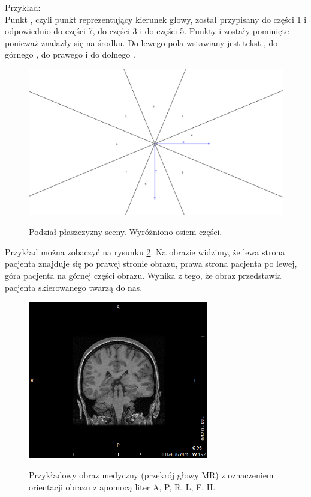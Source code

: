 \begin{itemize}
          Przykład:\\
          Punkt , czyli punkt reprezentujący kierunek głowy, został przypisany do części 1 i odpowiednio  do części 7,  do części 3 i  do części 5.
          Punkty  i  zostały pominięte ponieważ znalazły się na środku.
          Do lewego pola wstawiany jest tekst , do górnego , do prawego  i do dolnego .

          \begin{figure}[!htbp]
              \caption{Podział płaszczyzny sceny. Wyróżniono osiem części.}
              \includegraphics[width=\textwidth]{img/imageorientationindicator-004.png}
              \centering
              \label{fig:imageorientationindicator4}
          \end{figure}

          Przykład można zobaczyć na rysunku \ref{fig:imageorientationindicator1}.
          Na obrazie widzimy, że lewa strona pacjenta znajduje się po prawej stronie obrazu, prawa strona pacjenta po lewej, góra pacjenta na górnej części obrazu.
          Wynika z tego, że obraz przedstawia pacjenta skierowanego twarzą do nas.

          \begin{figure}[!htbp]
              \caption{Przykładowy obraz medyczny (przekrój głowy MR) z oznaczeniem orientacji obrazu z apomocą liter A, P, R, L, F, H.}
              \includegraphics[width=0.7\textwidth]{img/imageorientationindicator-002.png}
              \centering
              \label{fig:imageorientationindicator1}
          \end{figure}


\end{itemize}
